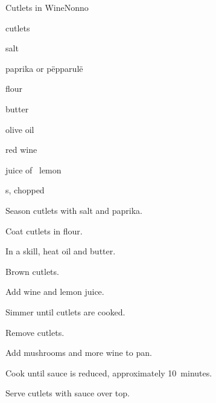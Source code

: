 \begin{recipe}{Cutlets in Wine}{Nonno}{}

\begin{ingredients}
\item {} cutlets
\item salt
\item paprika or pëpparulë
\item flour
\item butter
\item olive oil
\item red wine
\item juice of \half{}~lemon
\item {}s, chopped
\end{ingredients}

\begin{directions}
\item Season cutlets with salt and paprika.
\item Coat cutlets in flour.
\item In a skill, heat oil and butter.
\item Brown cutlets.
\item Add wine and lemon juice.
\item Simmer until cutlets are cooked.
\item Remove cutlets.
\item Add mushrooms and more wine to pan.
\item Cook until sauce is reduced, approximately 10~minutes.
\item Serve cutlets with sauce over top.
\end{directions}

\end{recipe}
